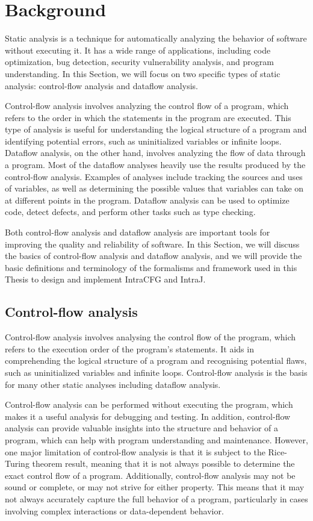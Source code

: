 \section{Background}
\label{sec:background}
Static analysis is a technique for automatically analyzing the behavior of software
without executing it. It has a wide range of applications, including code optimization,
bug detection, security vulnerability analysis, and program understanding.
In this Section, we will focus on two specific types of static analysis:
control-flow analysis and dataflow analysis.

Control-flow analysis involves analyzing the control flow of a program,
which refers to the order in which the statements in the program are executed.
This type of analysis is useful for understanding the logical structure of a
program and identifying potential errors, such as uninitialized variables or
infinite loops.
Dataflow analysis, on the other hand, involves analyzing the flow of data through
a program. Most of the dataflow analyses heavily use the results produced by the control-flow analysis. 
Examples of analyses include tracking the sources and uses of variables, as well as
determining the possible values that variables can take on at different points in
the program. Dataflow analysis can be used to optimize code, detect defects, and
perform other tasks such as type checking.

Both control-flow analysis and dataflow analysis are important tools for improving
the quality and reliability of software. 
In this Section, we will discuss the basics of control-flow analysis and dataflow analysis,
and we will provide the basic definitions and terminology of the formalisms and framework used
in this Thesis to design and implement IntraCFG and IntraJ.



\subsection{Control-flow analysis}

Control-flow analysis involves analysing the control flow of the program, which refers
to the execution order of the program's statements. It aids in comprehending the logical
structure of a program and recognising potential flaws, such as uninitialized variables
and infinite loops.
Control-flow analysis is the basis for many other static analyses including dataflow analysis.


Control-flow analysis can be performed without executing the program, which makes
it a useful analysis for debugging and testing. In addition, control-flow analysis
can provide valuable insights into the structure and behavior of a program,
which can help with program understanding and maintenance.
However, one major limitation of control-flow analysis is that it is subject to the Rice-Turing theorem result,
meaning that it is not always possible to determine the exact control flow of a program.
Additionally, control-flow analysis may not be sound or complete, or may not
strive for either property. This means that it may not always accurately capture
the full behavior of a program, particularly in cases involving complex
interactions or data-dependent behavior.

